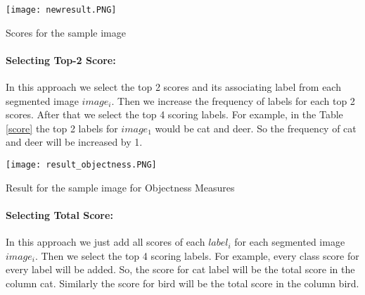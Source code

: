 
\begin{table}[!htb]
 \centering
  \texttt{[image: newresult.PNG]}
  \caption{Scores for the sample image}
  \label{score}
\end{table}

\paragraph{Selecting Top-2 Score:}
In this approach we select the top 2 scores and its associating label from each segmented image $image_{i}$. Then we increase the frequency of labels for each top 2 scores. After that we select the top 4 scoring labels.  For example, in the Table \ref{score} the top 2 labels for $image_{1}$ would be cat and deer. So the frequency of cat and deer will be increased by 1.


\begin{table}[!htb]
\centering
  \texttt{[image: result\_objectness.PNG]}
  \caption{Result for the sample image for Objectness Measures}
   \label{resobj}
\end{table}

\paragraph{Selecting Total Score:}
In this approach we just add all scores of each $label_{i}$ for each segmented image $image_{i}$. Then we select the top 4 scoring labels. For example, every class score for every label will be added. So, the score for cat label will be the total score in the column cat. Similarly the score for bird will be the total score in the column bird.


